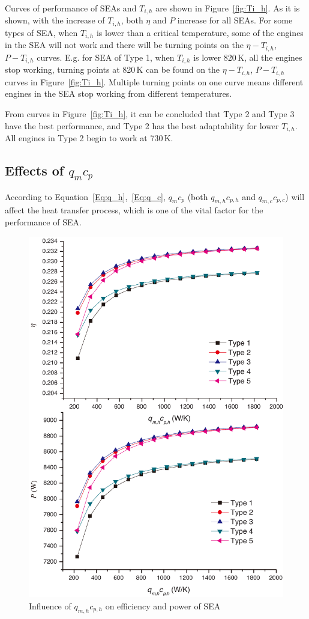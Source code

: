 \documentclass[preprint,5p, twocolumn]{elsarticle}
\begin{document}
Curves of performance of SEAs and $T_{i,h}$ are shown in Figure~\ref{fig:Ti_h}.
As it is shown, with the increase of $T_{i,h}$, both $\eta$ and $P$ increase for all SEAs. For some types of SEA, when $T_{i,h}$ is lower than a critical temperature, some of the engines in the SEA will not work and there will be turning points on the $\eta-T_{i,h}$, $P-T_{i,h}$ curves. E.g. for SEA of Type 1, when $T_{i,h}$ is lower 820\,K, all the engines stop working, turning points at 820\,K can be found on the $\eta-T_{i,h}$, $P-T_{i,h}$ curves in Figure~\ref{fig:Ti_h}. Multiple turning points on one curve means different engines in the SEA stop working from different temperatures.

From curves in Figure~\ref{fig:Ti_h}, it can be concluded that Type 2 and Type 3 have the best performance, and Type 2 has the best adaptability for lower $T_{i,h}$. All engines in Type 2 begin to work at 730\,K.

\subsection{Effects of $q_mc_p$}

According to Equation~\ref{Eq:q_h},~\ref{Eq:q_c}, $q_mc_p$ (both $q_{m,h}c_{p,h}$ and $q_{m,c}c_{p,c}$) will affect the heat transfer process, which is one of the vital factor for the performance of SEA.


\noindent \begin{figure}[htbp]
\begin{center}
	\includegraphics[width = 0.7\columnwidth]{./graphics/qm_hcp_h}
	\caption{Influence of $q_{m,h}c_{p,h}$ on efficiency and power of SEA}
	\label{fig:qm_hcp_h}
\end{center}
\end{figure}
\end{document}
